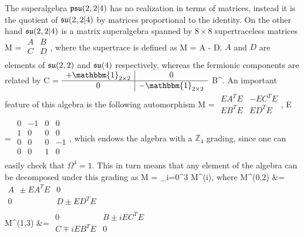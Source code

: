 The superalgebra $\mathfrak{psu}(2,2|4)$ has no realization in terms of matrices, instead it is the quotient of $\mathfrak{su}(2,2|4)$ by matrices proportional to the identity. 
On the other hand $\mathfrak{su}(2,2|4)$ is a matrix superalgebra spanned by $8\times8$ supertraceless matrices
\beq
M = \( {\begin{array}{c|c}
 A & B  \\
 \hline
 C & D  \\
 \end{array} } \),
\eeq
where the supertrace is defined as 
\beq
\str M = \tr A - \tr D.
\eeq
$A$ and $D$ are elements of $\mathfrak{su}(2,2)$ and $\mathfrak{su}(4)$ respectively, whereas the fermionic components are related by
\beq
	C = \( {\begin{array}{c|c}
 +\mathbbm{1}_{2\times2} & 0  \\
 \hline
 0 & -\mathbbm{1}_{2\times2}  \\
 \end{array} } \) B^\dagger.
\eeq
An important feature of this algebra is the following automorphism
\beq
\Omega \circ M = \( {\begin{array}{c|c}
 E A^T E & -E C^T E  \\
 \hline
 E B^T E & E D^T E \\
 \end{array} } \),
 \; \quad  \;
E = \( {\begin{array}{cccc}
 0 & -1 & 0 & 0  \\
 1 & 0 & 0 & 0 \\
 0 & 0 & 0 & -1  \\
 0 & 0 & 1 & 0 \\
 \end{array} } \),
\eeq
which endows the algebra with a $\mathbb{Z}_4$ grading, since one can easily check that $\Omega^4 = 1$.
This in turn means that any element of the algebra can be decomposed under this grading as
\beq
	M = \sum_{i=0}^3 M^{(i)},
\eeq
where
\beqa
	\label{eq:M_components}
	M^{(0,2)} &=  \( {\begin{array}{c|c}
 A \;\, \pm E A^T E & 0  \\
 \hline
 0 & D \pm E D^T E  \nonumber \\
 \end{array} } \) \\
 M^{(1,3)} &=  \( {\begin{array}{c|c}
 0 & B \pm i E C^T E  \\
 \hline
 C \mp i E B^T E & 0  \\
 \end{array} } \)
